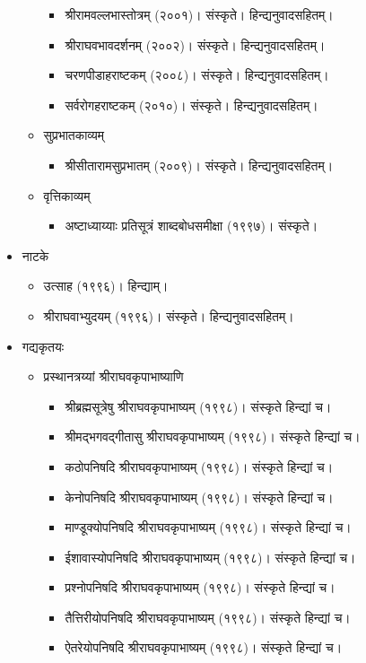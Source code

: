 \begin{itemize}
\begin{itemize}
\begin{itemize}
		\item श्रीरामवल्लभास्तोत्रम् (२००१)। संस्कृते। हिन्द्यनुवादसहितम्।
		\item श्रीराघवभावदर्शनम् (२००२)। संस्कृते। हिन्द्यनुवादसहितम्।
		\item चरणपीडाहराष्टकम् (२००८)। संस्कृते। हिन्द्यनुवादसहितम्।
		\item सर्वरोगहराष्टकम् (२०१०)। संस्कृते। हिन्द्यनुवादसहितम्।
	\end{itemize}
	\item सुप्रभातकाव्यम्
	\begin{itemize}
		\item श्रीसीतारामसुप्रभातम् (२००९)। संस्कृते। हिन्द्यनुवादसहितम्।
	\end{itemize}
	\item वृत्तिकाव्यम्
	\begin{itemize}
		\item अष्टाध्याय्याः प्रतिसूत्रं शाब्दबोधसमीक्षा (१९९७)। संस्कृते।
	\end{itemize}
	\end{itemize}
\item नाटके
	\begin{itemize}
	\item उत्साह (१९९६)। हिन्द्याम्।
	\item श्रीराघवाभ्युदयम् (१९९६)। संस्कृते। हिन्द्यनुवादसहितम्।
	\end{itemize}
\item गद्यकृतयः
	\begin{itemize}
	\item प्रस्थानत्रय्यां श्रीराघवकृपाभाष्याणि
		\begin{itemize}
		\item श्रीब्रह्मसूत्रेषु श्रीराघवकृपाभाष्यम् (१९९८)। संस्कृते हिन्द्यां च।
		\item श्रीमद्भगवद्गीतासु श्रीराघवकृपाभाष्यम् (१९९८)। संस्कृते हिन्द्यां च।
		\item कठोपनिषदि श्रीराघवकृपाभाष्यम् (१९९८)। संस्कृते हिन्द्यां च।
		\item केनोपनिषदि श्रीराघवकृपाभाष्यम् (१९९८)। संस्कृते हिन्द्यां च।
		\item माण्डूक्योपनिषदि श्रीराघवकृपाभाष्यम् (१९९८)। संस्कृते हिन्द्यां च।
		\item ईशावास्योपनिषदि श्रीराघवकृपाभाष्यम् (१९९८)। संस्कृते हिन्द्यां च।
		\item प्रश्नोपनिषदि श्रीराघवकृपाभाष्यम् (१९९८)। संस्कृते हिन्द्यां च।
		\item तैत्तिरीयोपनिषदि श्रीराघवकृपाभाष्यम् (१९९८)। संस्कृते हिन्द्यां च।
		\item ऐतरेयोपनिषदि श्रीराघवकृपाभाष्यम् (१९९८)। संस्कृते हिन्द्यां च।

\end{itemize}
\end{itemize}
\end{itemize}

